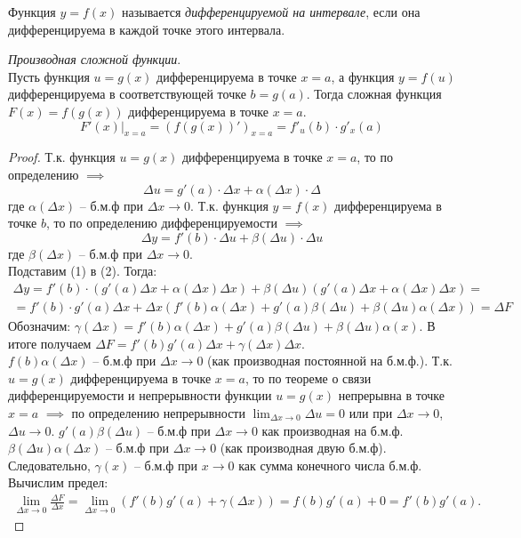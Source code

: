 \begin{definition}
  Функция $y = f(x)$ называется \textit{дифференцируемой на интервале}, если она дифференцируема в каждой точке этого интервала.
\end{definition}

\begin{theorem}
  \textit{Производная сложной функции}. \\
  Пусть функция $u = g(x)$ дифференцируема в точке $x = a$, а функция $y = f(u)$ дифференцируема в соответствующей точке  $b = g(a)$.
  Тогда сложная функция $F(x) = f(g(x))$ дифференцируема в точке $x = a$. \[
     F'(x) |_{x = a} = \left(f(g(x))'\right)_{x = a} = f'_u(b) \cdot g'_x(a)
  \]
\end{theorem}
\begin{proof}
  Т.к. функция $u = g(x)$ дифференцируема в точке $x = a$, то по определению $\implies$\[
    \Delta u = g'(a) \cdot \Delta x + \alpha(\Delta x) \cdot \Delta \tag{1}
  \] 
  где $\alpha(\Delta x)$ -- б.м.ф при $\Delta x \to 0$.
  Т.к. функция $y = f(x)$ дифференцируема в точке  $b$, то по определению дифференцируемости  $\implies$ \[
    \Delta y = f'(b) \cdot \Delta u + \beta(\Delta u) \cdot \Delta u \tag{2}
  \] 
  где $\beta(\Delta x)$ -- б.м.ф при $\Delta x \to 0$. \\
  Подставим (1) в (2). Тогда:
  \begin{gather*}
    \Delta y = f'(b) \cdot \left( g'(a) \Delta x + \alpha(\Delta x) \Delta x \right) + \beta(\Delta u)\left( g'(a) \Delta x + \alpha(\Delta x) \Delta x \right) = \\
    = f'(b) \cdot  g'(a) \Delta x + \Delta x\left(f'(b) \alpha(\Delta x) + g'(a) \beta(\Delta u) + \beta(\Delta u) \alpha(\Delta x)\right) = \Delta F
  \end{gather*}
  Обозначим: $\gamma(\Delta x) = f'(b) \alpha(\Delta x) + g'(a) \beta(\Delta u) + \beta(\Delta u) \alpha(x)$. В итоге получаем $\Delta F = f'(b)g'(a)\Delta x + \gamma(\Delta x)\Delta x$. \\
  $f(b) \alpha(\Delta x)$ -- б.м.ф при $\Delta x \to 0$ (как производная постоянной на б.м.ф.). 
  Т.к. $u = g(x)$ дифференцируема в точке $x = a$, то по теореме о связи дифференцируемости и непрерывности функции $u = g(x)$ непрерывна в точке $x = a$  $\implies$ по определению непрерывности $\lim_{\Delta x \to 0} \Delta u = 0$ или при $\Delta x \to 0$, $\Delta u \to 0$. $g'(a) \beta(\Delta u)$ -- б.м.ф при $\Delta x \to  0$ как производная на б.м.ф. $\beta(\Delta u) \alpha(\Delta x)$ -- б.м.ф при $\Delta x \to  0$ (как производная двую б.м.ф).
  Следовательно, $\gamma(x)$ -- б.м.ф при $x \to 0$ как сумма конечного числа б.м.ф. \\
  Вычислим предел:
  \begin{gather*}
    \lim_{\Delta x \to 0} \frac{\Delta F}{\Delta x} = \lim_{\Delta x \to 0} \left( f'(b) g'(a) + \gamma(\Delta x) \right) = f(b)g'(a) + 0 = f'(b) g'(a).
  \end{gather*}
\end{proof}

